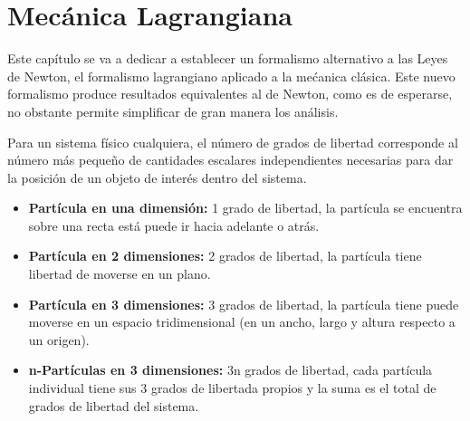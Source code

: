 \documentclass[/home/hernan/Documentos/Apuntes_mecanica_teorica/main.tex]{subfiles}
\begin{document}
    \part{Mecánica Lagrangiana}

    Este capítulo se va a dedicar a establecer un formalismo alternativo a las Leyes de Newton, el formalismo lagrangiano aplicado a la mećanica clásica. Este nuevo formalismo produce resultados equivalentes al de Newton, como es de esperarse, no obstante permite simplificar de gran manera los análisis.

    \begin{definition}
        Para un sistema físico cualquiera, el número de grados de libertad corresponde al número más pequeño de cantidades escalares independientes necesarias para dar la posición de un objeto de interés dentro del sistema.

        \begin{itemize}
            \item \textbf{Partícula en una dimensión:} 1 grado de libertad, la partícula se encuentra sobre una recta está puede ir hacia adelante o atrás.
            \item \textbf{Partícula en 2 dimensiones:} 2 grados de libertad, la partícula tiene libertad de moverse en un plano.
            \item \textbf{Partícula en 3 dimensiones:} 3 grados de libertad, la partícula tiene puede moverse en un espacio tridimensional (en un ancho, largo y altura respecto a un origen).
            \item \textbf{n-Partículas en 3 dimensiones:} 3n grados de libertad, cada partícula individual tiene sus 3 grados de libertada propios y la suma es el total de grados de libertad del sistema.
        \end{itemize}
        
    \end{definition}
\end{document}
